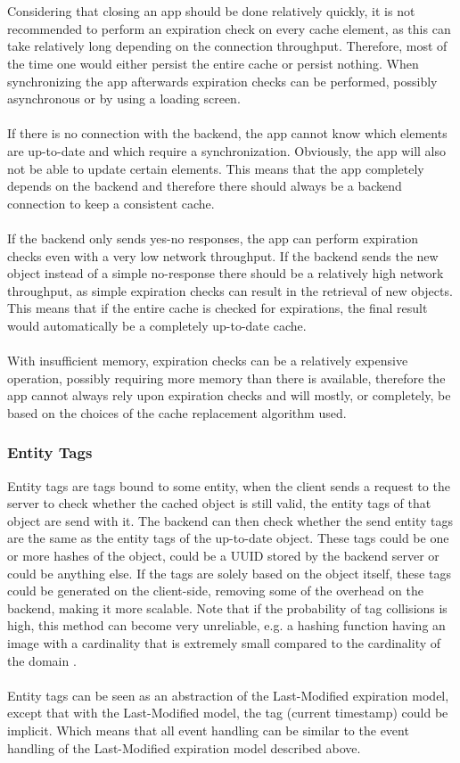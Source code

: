 \documentclass[pdftex,a4paper,12pt,twoside]{report}
\begin{document}
\\\\
Considering that closing an app should be done relatively quickly, it is not recommended to perform an expiration check on every cache element, as this can take relatively long depending on the connection throughput. Therefore, most of the time one would either persist the entire cache or persist nothing. When synchronizing the app afterwards expiration checks can be performed, possibly asynchronous or by using a loading screen.
\\\\
If there is no connection with the backend, the app cannot know which elements are up-to-date and which require a synchronization. Obviously, the app will also not be able to update certain elements. This means that the app completely depends on the backend and therefore there should always be a backend connection to keep a consistent cache.
\\\\
If the backend only sends yes-no responses, the app can perform expiration checks even with a very low network throughput. If the backend sends the new object instead of a simple no-response there should be a relatively high network throughput, as simple expiration checks can result in the retrieval of new objects. This means that if the entire cache is checked for expirations, the final result would automatically be a completely up-to-date cache.
\\\\
With insufficient memory, expiration checks can be a relatively expensive operation, possibly requiring more memory than there is available, therefore the app cannot always rely upon expiration checks and will mostly, or completely, be based on the choices of the cache replacement algorithm used.
\subsubsection{Entity Tags}
Entity tags are tags bound to some entity, when the client sends a request to the server to check whether the cached object is still valid, the entity tags of that object are send with it. The backend can then check whether the send entity tags are the same as the entity tags of the up-to-date object. These tags could be one or more hashes of the object, could be a UUID stored by the backend server or could be anything else. If the tags are solely based on the object itself, these tags could be generated on the client-side, removing some of the overhead on the backend, making it more scalable. Note that if the probability of tag collisions is high, this method can become very unreliable, e.g. a hashing function having an image with a cardinality that is extremely small compared to the cardinality of the domain \citep{http_etag}.
\\\\
Entity tags can be seen as an abstraction of the Last-Modified expiration model, except that with the Last-Modified model, the tag (current timestamp) could be implicit. Which means that all event handling can be similar to the event handling of the Last-Modified expiration model described above.
\end{document}
